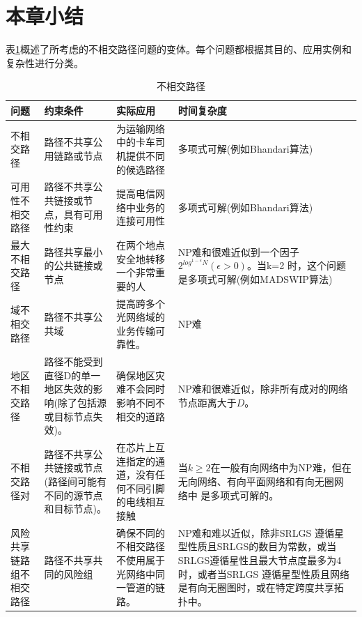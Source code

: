 \section{本章小结}
表\ref{tab:disjointPath}概述了所考虑的不相交路径问题的变体。每个问题都根据其目的、应用实例和复杂性进行分类。

\begin{table}[htbp]
\caption{不相交路径}\label{tab:disjointPath}
\vspace{0.5em}\centering\wuhao
\begin{tabularx}{46em}{|*{4}{>{\centering\arraybackslash}X|}}
\toprule[1.5pt]
问题   & 约束条件   & 实际应用 & 时间复杂度  \\
\midrule[1pt]
不相交路径 & 路径不共享公用链路或节点 & 为运输网络中的卡车司机提供不同的候选路径 & 多项式可解(例如Bhandari算法\cite{bhandari1997optimal})\\
\hline
可用性不相交路径 & 路径不共享公共链接或节点，具有可用性约束 & 提高电信网络中业务的连接可用性 & 多项式可解(例如Bhandari算法\cite{bhandari1997optimal})\\
\hline
最大不相交路径 & 路径共享最小的公共链接或节点 & 在两个地点安全地转移一个非常重要的人 & NP难和很难近似到一个因子$2^{log^{1-\epsilon}N}(\epsilon>0)$。当k=2 时，这个问题是多项式可解(例如MADSWIP算法\cite{taft1999quality})\\
\hline
域不相交路径 & 路径不共享公共域 & 提高跨多个光网络域的业务传输可靠性。 & NP难\cite{gao2013domain}\\
\hline
地区不相交路径 & 路径不能受到直径D的单一地区失效的影响(除了包括源或目标节点失效)。 & 确保地区灾难不会同时影响不同不相交的道路 & NP难和很难近似\cite{trajanovski2015finding}，除非所有成对的网络节点距离大于$D$。\\
\hline
不相交路径对 & 路径不共享公共链接或节点(路径间可能有不同的源节点和目标节点)。 & 在芯片上互连指定的通道，没有任何不同引脚的电线相互接触 & 当$k\geq2$在一般有向网络中为NP难\cite{fortune1980directed}，但在无向网络\cite{robertson1995graph}、有向平面网络\cite{schrijver1994finding}和有向无圈网络中\cite{fortune1980directed} 是多项式可解的。 \\
\hline
风险共享链路组不相交路径 & 路径不共享共同的风险组 & 确保不同的不相交路径不使用属于光网络中同一管道的链路。 & NP难\cite{hu2003diverse}和难以近似\cite{coudert2007shared}，除非SRLGS 遵循星型性质且SRLGS的数目为常数\cite{bermond2013srlg}，或当SRLGS遵循星性且最大节点度最多为4\cite{bermond2013srlg}时，或者当SRLGS 遵循星型性质且网络是有向无圈图\cite{bermond2013srlg}时，或在特定跨度共享拓扑\cite{bhandari1994optimal}中。\\
\bottomrule[1.5pt]
\end{tabularx}
\vspace{\baselineskip}
\end{table}
